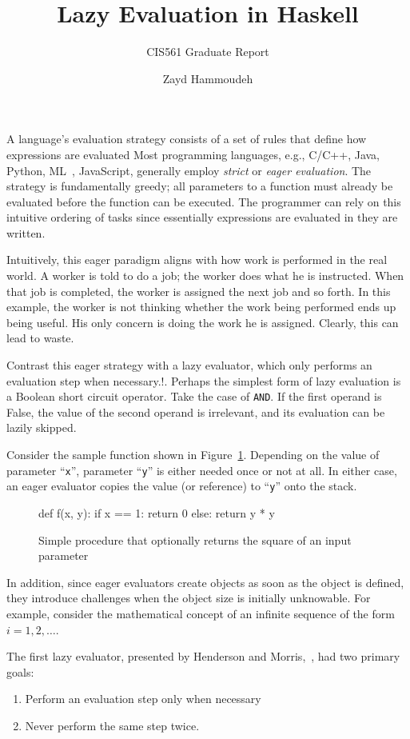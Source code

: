 \documentclass[11pt]{report}
\title{Lazy Evaluation in Haskell}
\subtitle{CIS561 Graduate Report}
\author{Zayd Hammoudeh}
\begin{document}
    A language's evaluation strategy consists of a set of rules that define how expressions are evaluated  Most programming languages, e.g., C/C++, Java, Python, ML~, JavaScript, generally employ \emph{strict} or \emph{eager evaluation}.  The strategy is fundamentally greedy; all parameters to a function must already be evaluated before the function can be executed.  The programmer can rely on this intuitive ordering of tasks since essentially expressions are evaluated in they are written.

    Intuitively, this eager paradigm aligns with how work is performed in the real world.  A worker is told to do a job; the worker does what he is instructed. When that job is completed, the worker is assigned the next job and so forth. In this example, the worker is not thinking whether the work being performed ends up being useful.  His only concern is doing the work he is assigned.  Clearly, this can lead to waste.

    Contrast this eager strategy with a lazy evaluator, which only performs an evaluation step when necessary.!\cite{Henderson:1976}. Perhaps the simplest form of lazy evaluation is a Boolean short circuit operator.  Take the case of {\tt AND}.  If the first operand is False, the value of the second operand is irrelevant, and its evaluation can be lazily skipped.

    Consider the sample function shown in Figure~\ref{lst:Square}.  Depending on the value of parameter ``{\tt x}'', parameter ``{\tt y}'' is either needed once or not at all.  In either case, an eager evaluator copies the value (or reference) to ``{\tt y}'' onto the stack.

    \begin{figure}
        \begin{listings}[python]
            def f(x, y):
            if x == 1:
            return 0
            else:
            return y * y
        \end{listings}
        \caption{Simple procedure that optionally returns the square of an input parameter}\label{lst:Square}
    \end{figure}

    In addition, since eager evaluators create objects as soon as the object is defined, they introduce challenges when the object size is initially unknowable.  For example, consider the mathematical concept of an infinite sequence of the form $i = 1, 2,\ldots$.

    The first lazy evaluator, presented by Henderson and Morris,~\cite{Henderson:1976}, had two primary goals:
    \begin{enumerate}
        \item Perform an evaluation step only when necessary
        \item Never perform the same step twice.
    \end{enumerate}
\noindent
\end{document}
